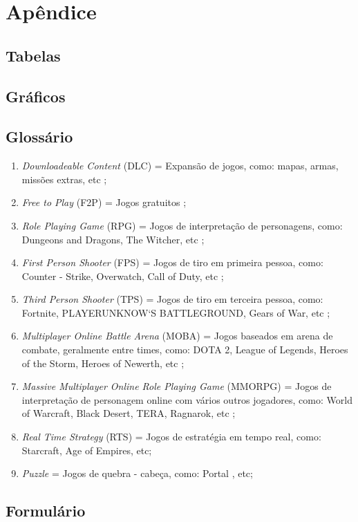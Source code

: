 \documentclass[11pt,a4paper]{article}
\begin{document}
\section{Apêndice}
\subsection{Tabelas}
\subsection{Gráficos}
\subsection{Glossário}

\begin{enumerate}[label=(\roman*)]
\item \textit{Downloadeable Content} (DLC) = Expansão de jogos, como: mapas, armas, missões extras, etc ;
\item \textit{Free to Play} (F2P) = Jogos gratuitos ;
\item \textit{Role Playing Game} (RPG) = Jogos de interpretação de personagens, como: Dungeons and Dragons, The Witcher, etc ;
\item \textit{First Person Shooter} (FPS) = Jogos de tiro em primeira pessoa, como: Counter - Strike, Overwatch, Call of Duty, etc ;
\item \textit{Third Person Shooter} (TPS) = Jogos de tiro em terceira pessoa, como: Fortnite, PLAYERUNKNOW`S BATTLEGROUND, Gears of War, etc ;
\item \textit{Multiplayer Online Battle Arena} (MOBA) = Jogos baseados em arena de combate, geralmente entre times, como: DOTA 2, League of Legends, Heroes of the Storm, Heroes of Newerth, etc ;
\item \textit{Massive Multiplayer Online Role Playing Game} (MMORPG) = Jogos de interpretação de personagem online com vários outros jogadores, como: World of Warcraft, Black Desert, TERA, Ragnarok, etc ;
\item \textit{Real Time Strategy} (RTS) = Jogos de estratégia em tempo real, como: Starcraft, Age of Empires, etc;
\item \textit{Puzzle} = Jogos de quebra - cabeça, como: Portal , etc;
\end{enumerate}

\subsection{Formulário}
\end{document}
